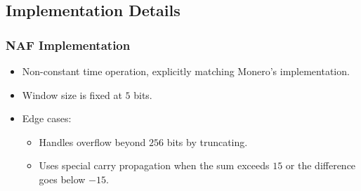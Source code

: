 \documentclass[12pt,a4paper]{article}
\begin{document}
\subsection{Implementation Details}

\subsubsection{NAF Implementation}
\begin{itemize}
  \item Non-constant time operation, explicitly matching Monero's implementation.  %
  \item Window size is fixed at $5$ bits.  %
  \item Edge cases:
    \begin{itemize}
      \item Handles overflow beyond $256$ bits by truncating.  %
      \item Uses special carry propagation when the sum exceeds $15$ or the difference goes below $-15$.  %
    \end{itemize}
\end{itemize}
\end{document}
